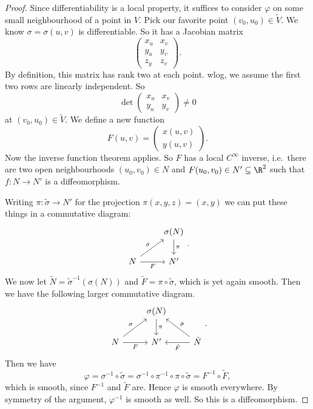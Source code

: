 \documentclass[a4paper]{article}
\begin{document}
\begin{proof}
  Since differentiability is a local property, it suffices to consider $\varphi$ on some small neighbourhood of a point in $V$. Pick our favorite point $(v_0, u_0) \in \tilde{V}$. We know $\sigma = \sigma(u, v)$ is differentiable. So it has a Jacobian matrix
  \[
    \begin{pmatrix}
      x_u & x_v\\
      y_u & y_v\\
      z_y & z_v
    \end{pmatrix}.
  \]
  By definition, this matrix has rank two at each point. wlog, we assume the first two rows are linearly independent. So
  \[
    \det
    \begin{pmatrix}
      x_u & x_v\\
      y_u & y_v
    \end{pmatrix} \not= 0
  \]
  at $(v_0, u_0) \in \tilde{V}$. We define a new function
  \[
    F(u, v) =
    \begin{pmatrix}
      x(u, v)\\
      y(u, v)
    \end{pmatrix}.
  \]
  Now the inverse function theorem applies. So $F$ has a local $C^\infty$ inverse, i.e.\ there are two open neighbourhoods $(u_0, v_0) \in N$ and $F(u_0, v_0) \in N' \subseteq \R^2$ such that $f: N \to N'$ is a diffeomorphism.

  Writing $\pi: \tilde{\sigma} \to N'$ for the projection $\pi(x, y, z) = (x, y)$ we can put these things in a commutative diagram:
  \[
    \begin{tikzcd}
      & \sigma(N) \ar[d, "\pi"]\\
      N \ar[r, "F"'] \ar[ru, "\sigma"] & N'
    \end{tikzcd}.
  \]
  We now let $\tilde{N} = \tilde{\sigma}^{-1}(\sigma(N))$ and $\tilde{F} = \pi \circ \tilde{\sigma}$, which is yet again smooth. Then we have the following larger commutative diagram.
  \[
    \begin{tikzcd}
      & \sigma(N) \ar[d, "\pi"]\\
      N \ar[r, "F"'] \ar[ru, "\sigma"] & N' & \tilde{N} \ar[l, "\tilde{F}"] \ar[lu, "\tilde{\sigma}"']
    \end{tikzcd}.
  \]
  Then we have
  \[
    \varphi = \sigma^{-1} \circ \tilde{\sigma} = \sigma^{-1} \circ \pi^{-1} \circ \pi \circ \tilde{\sigma} = F^{-1} \circ \tilde{F},
  \]
  which is smooth, since $F^{-1}$ and $\tilde{F}$ are. Hence $\varphi$ is smooth everywhere. By symmetry of the argument, $\varphi^{-1}$ is smooth as well. So this is a diffeomorphism.
\end{proof}
\end{document}

